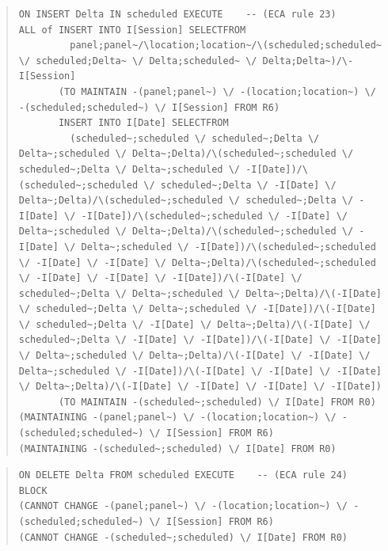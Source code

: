 \documentclass[10pt,a4paper]{report}              %
\theoremstyle{plain}\theorembodyfont{\rmfamily}\newtheorem{definition}{Definition}[section]
\theoremstyle{plain}\theorembodyfont{\rmfamily}\newtheorem{designrule}[definition]{Requirement}
\begin{document}
\begin{quote}
\begin{verbatim}
ON INSERT Delta IN scheduled EXECUTE    -- (ECA rule 23)
ALL of INSERT INTO I[Session] SELECTFROM
         panel;panel~/\location;location~/\(scheduled;scheduled~ \/ scheduled;Delta~ \/ Delta;scheduled~ \/ Delta;Delta~)/\-I[Session]
       (TO MAINTAIN -(panel;panel~) \/ -(location;location~) \/ -(scheduled;scheduled~) \/ I[Session] FROM R6)
       INSERT INTO I[Date] SELECTFROM
         (scheduled~;scheduled \/ scheduled~;Delta \/ Delta~;scheduled \/ Delta~;Delta)/\(scheduled~;scheduled \/ scheduled~;Delta \/ Delta~;scheduled \/ -I[Date])/\(scheduled~;scheduled \/ scheduled~;Delta \/ -I[Date] \/ Delta~;Delta)/\(scheduled~;scheduled \/ scheduled~;Delta \/ -I[Date] \/ -I[Date])/\(scheduled~;scheduled \/ -I[Date] \/ Delta~;scheduled \/ Delta~;Delta)/\(scheduled~;scheduled \/ -I[Date] \/ Delta~;scheduled \/ -I[Date])/\(scheduled~;scheduled \/ -I[Date] \/ -I[Date] \/ Delta~;Delta)/\(scheduled~;scheduled \/ -I[Date] \/ -I[Date] \/ -I[Date])/\(-I[Date] \/ scheduled~;Delta \/ Delta~;scheduled \/ Delta~;Delta)/\(-I[Date] \/ scheduled~;Delta \/ Delta~;scheduled \/ -I[Date])/\(-I[Date] \/ scheduled~;Delta \/ -I[Date] \/ Delta~;Delta)/\(-I[Date] \/ scheduled~;Delta \/ -I[Date] \/ -I[Date])/\(-I[Date] \/ -I[Date] \/ Delta~;scheduled \/ Delta~;Delta)/\(-I[Date] \/ -I[Date] \/ Delta~;scheduled \/ -I[Date])/\(-I[Date] \/ -I[Date] \/ -I[Date] \/ Delta~;Delta)/\(-I[Date] \/ -I[Date] \/ -I[Date] \/ -I[Date])
       (TO MAINTAIN -(scheduled~;scheduled) \/ I[Date] FROM R0)
(MAINTAINING -(panel;panel~) \/ -(location;location~) \/ -(scheduled;scheduled~) \/ I[Session] FROM R6)
(MAINTAINING -(scheduled~;scheduled) \/ I[Date] FROM R0)
\end{verbatim}
\end{quote}
\begin{quote}
\begin{verbatim}
ON DELETE Delta FROM scheduled EXECUTE    -- (ECA rule 24)
BLOCK
(CANNOT CHANGE -(panel;panel~) \/ -(location;location~) \/ -(scheduled;scheduled~) \/ I[Session] FROM R6)
(CANNOT CHANGE -(scheduled~;scheduled) \/ I[Date] FROM R0)
\end{verbatim}
\end{quote}
\end{document}
